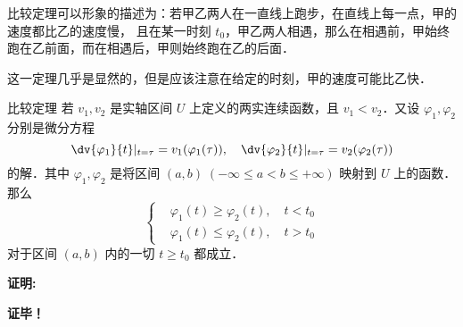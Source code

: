 比较定理可以形象的描述为：若甲乙两人在一直线上跑步，在直线上每一点，甲的速度都比乙的速度慢， 且在某一时刻 $t_0$，甲乙两人相遇，那么在相遇前，甲始终跑在乙前面，而在相遇后，甲则始终跑在乙的后面．

这一定理几乎是显然的，但是应该注意在给定的时刻，甲的速度可能比乙快．
\begin{theorem}{比较定理}
若 $v_1,v_2$ 是实轴区间 $U$ 上定义的两实连续函数，且 $v_1<v_2$．又设 $\varphi_1,\varphi_2$ 分别是微分方程
\begin{equation}
\dv{\varphi_1}{t}|_{t=\tau}=v_1(\varphi_1(\tau)), \quad \dv{\varphi_2}{t}|_{t=\tau}=v_2(\varphi_2(\tau))
\end{equation}
的解．其中 $\varphi_1,\varphi_2$ 是将区间 $(a,b)\;(-\infty\leq a<b\leq+\infty)$ 映射到 $U$ 上的函数．那么
\begin{equation}
\left\{\begin{aligned}
    &\varphi_1(t)\geq\varphi_2(t),\quad t<t_0\\
    &\varphi_1(t)\leq\varphi_2(t),\quad t>t_0
\end{aligned}\right.
\end{equation}
对于区间 $(a,b)$ 内的一切 $t\geq t_0$ 都成立．
\end{theorem} 
\textbf{证明:}


\textbf{证毕！}